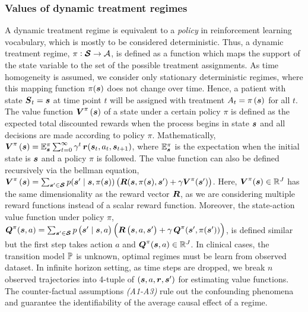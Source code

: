 \subsubsection*{Values of dynamic treatment regimes}
A dynamic treatment regime is equivalent to a \textit{policy} in reinforcement learning vocabulary, which is mostly to be considered deterministic. Thus, a dynamic treatment regime, $\pi : \boldsymbol{\mathcal{S}} \to \mathcal{A}$, is defined as a function which maps the support of the state variable to the set of the possible treatment assignments. As time homogeneity is assumed, we consider only stationary deterministic regimes, where this mapping function $\pi(\boldsymbol{s})$ does not change over time. Hence, a patient with state $\boldsymbol{S}_t = \boldsymbol{s}$ at time point $t$ will be assigned with treatment $A_t = \pi\left(\boldsymbol{s}\right)$ for all $t$.  
The value function $\boldsymbol{V}^{\pi}\left(\boldsymbol{s}\right)$ of a state under a certain policy $\pi$ is defined as the expected total discounted rewards when the process begins in state $\boldsymbol{s}$ and all decisions are made according to policy $\pi$. Mathematically, $\boldsymbol{V}^{\pi}\left(\boldsymbol{s}\right) = \mathbb{E}_{\boldsymbol{s}}^{\pi} \sum_{t=0}^{\infty} \gamma^{t} \, \boldsymbol{r}(\boldsymbol{s}_t, a_t, \boldsymbol{s}_{t+1})$, where $\mathbb{E}_{\boldsymbol{s}}^{\pi}$ is the expectation when the initial state is $\boldsymbol{s}$ and a policy $\pi$ is followed. The value function can also be defined recursively via the bellman equation, $\boldsymbol{V}^{\pi}\left(\boldsymbol{s}\right) = \sum_{\boldsymbol{s}^{\prime}\in\boldsymbol{\mathcal{S}}}  p(\boldsymbol{s}^{\prime} \mid \boldsymbol{s}, \pi(\boldsymbol{s})) \left(\boldsymbol{R}(\boldsymbol{s}, \pi(\boldsymbol{s}), \boldsymbol{s}^{\prime}) + \gamma \boldsymbol{V}^{\pi}(\boldsymbol{s}^{\prime})\right)$. Here, $\boldsymbol{V}^{\pi}(\boldsymbol{s}) \in \mathbb{R}^J$ has the same dimensionality as the reward vector $\boldsymbol{R}$, as we are considering multiple reward functions instead of a scalar reward function.  Moreover, the state-action value function under policy $\pi$, $\boldsymbol{Q}^{\pi}(\boldsymbol{s}, a) =\sum_{\boldsymbol{s}^{\prime} \in \boldsymbol{\mathcal{S}}}  p\left(\boldsymbol{s}^{\prime} \mid \boldsymbol{s}, a\right) \left( \boldsymbol{R}\left(\boldsymbol{s}, a, \boldsymbol{s}^{\prime}\right) + \gamma \, \boldsymbol{Q}^{\pi}(\boldsymbol{s}^{\prime}, \pi(\boldsymbol{s}^{\prime}) ) \right)$,
is defined similar but the first step takes action $a$ and $\boldsymbol{Q}^{\pi}(\boldsymbol{s}, a) \in \mathbb{R}^J$. In clinical cases, the transition model $\mathbb{P}$ is unknown, optimal regimes must be learn from observed dataset. In infinite horizon setting, as time steps are dropped, we break $n$ observed trajectories into 4-tuple of $(\boldsymbol{s}, a, \boldsymbol{r}, \boldsymbol{s}^{\prime})$ for estimating value functions. The counter-factual assumptions \textit{(A1-A3)} rule out the confounding phenomena and guarantee the identifiability of the average causal effect of a regime.

